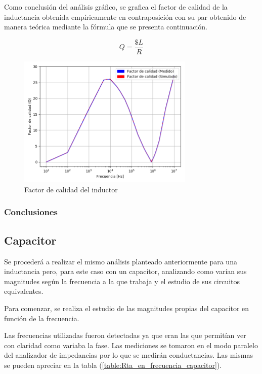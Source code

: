 Como conclusión del análisis gráfico, se grafica el factor de calidad de la inductancia obtenida empíricamente en contraposición con su par obtenido de manera teórica mediante la fórmula que se presenta continuación.

\begin{equation}
Q= \frac{\$L}{R}
\end{equation}

\begin{figure}[H]
\centering
\includegraphics[width=0.75\textwidth]{Ejercicio_1(Germo)/Grafico/QteovsQcalc.png}
\caption{Factor de calidad del inductor}
\label{fig:QteovsQcalc}
\end{figure}

\subsubsection*{Conclusiones}


\subsection{Capacitor}
Se procederá a realizar el mismo análisis planteado anteriormente para una inductancia pero, para este caso con un capacitor, analizando como varían sus magnitudes según la frecuencia a la que trabaja y el estudio de sus circuitos equivalentes.

Para comenzar, se realiza el estudio de las magnitudes propias del capacitor en función de la frecuencia. \par Las frecuencias utilizadas fueron detectadas ya que eran las que permitían ver con claridad como variaba la fase. Las mediciones se tomaron en el modo paralelo del analizador de impedancias por lo que se medirán conductancias. Las mismas se pueden apreciar en la tabla (\ref{table:Rta_en_frecuencia_capacitor}).

